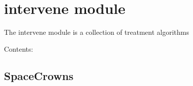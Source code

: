 \documentclass[letterpaper,10pt,english]{sphinxmanual}
\begin{document}
\begin{fulllineitems}
\begin{fulllineitems}
\begin{quote}
\begin{description}
\end{description}\end{quote}

\end{fulllineitems}


\end{fulllineitems}



\section{intervene module}
\label{intervene:module-intervene}\label{intervene:intervene-module}\label{intervene::doc}
The intervene module is a collection of treatment algorithms

Contents:


\subsection{SpaceCrowns}
\label{SpaceCrowns:spacecrowns}\label{SpaceCrowns::doc}
\end{document}
